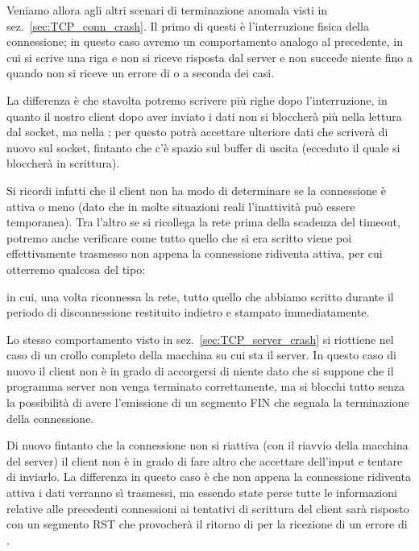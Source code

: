 Veniamo allora agli altri scenari di terminazione anomala visti in
sez.~\ref{sec:TCP_conn_crash}. Il primo di questi è l'interruzione fisica della
connessione; in questo caso avremo un comportamento analogo al precedente, in
cui si scrive una riga e non si riceve risposta dal server e non succede
niente fino a quando non si riceve un errore di  o
 a seconda dei casi.

La differenza è che stavolta potremo scrivere più righe dopo l'interruzione,
in quanto il nostro client dopo aver inviato i dati non si bloccherà più nella
lettura dal socket, ma nella ; per questo potrà accettare
ulteriore dati che scriverà di nuovo sul socket, fintanto che c'è spazio sul
buffer di uscita (ecceduto il quale si bloccherà in scrittura). 

Si ricordi infatti che il client non ha modo di determinare se la connessione
è attiva o meno (dato che in molte situazioni reali l'inattività può essere
temporanea).  Tra l'altro se si ricollega la rete prima della scadenza del
timeout, potremo anche verificare come tutto quello che si era scritto viene
poi effettivamente trasmesso non appena la connessione ridiventa attiva, per
cui otterremo qualcosa del tipo:
in cui, una volta riconnessa la rete, tutto quello che abbiamo scritto durante
il periodo di disconnessione restituito indietro e stampato immediatamente.

Lo stesso comportamento visto in sez.~\ref{sec:TCP_server_crash} si riottiene
nel caso di un crollo completo della macchina su cui sta il server. In questo
caso di nuovo il client non è in grado di accorgersi di niente dato che si
suppone che il programma server non venga terminato correttamente, ma si
blocchi tutto senza la possibilità di avere l'emissione di un segmento FIN che
segnala la terminazione della connessione. 

Di nuovo fintanto che la connessione non si riattiva (con il riavvio della
macchina del server) il client non è in grado di fare altro che accettare
dell'input e tentare di inviarlo. La differenza in questo caso è che non
appena la connessione ridiventa attiva i dati verranno sì trasmessi, ma
essendo state perse tutte le informazioni relative alle precedenti connessioni
ai tentativi di scrittura del client sarà risposto con un segmento RST che
provocherà il ritorno di  per la ricezione di un errore di
.


